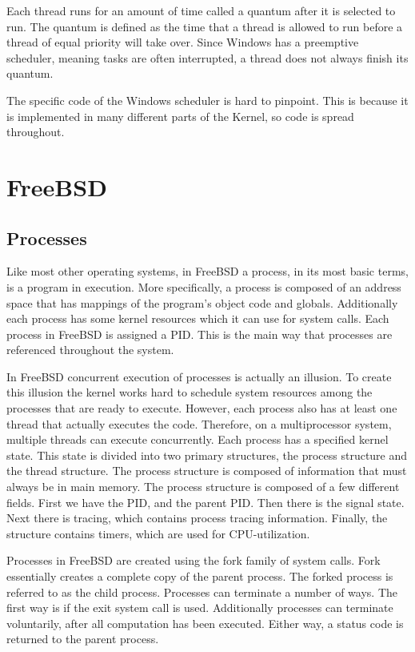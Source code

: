 \documentclass[letterpaper,10pt,titlepage,draftclsnofoot,onecolumn]{IEEEtran}
\begin{document}
Each thread runs for an amount of time called a quantum after it is selected to run. The quantum is defined as the time that a thread is allowed to run before a thread of equal priority will take over. Since Windows has a preemptive scheduler, meaning tasks are often interrupted, a thread does not always finish its quantum. 

The specific code of the Windows scheduler is hard to pinpoint. This is because it is implemented in many different parts of the Kernel, so code is spread throughout. 

\section{FreeBSD}

\subsection{Processes}
Like most other operating systems, in FreeBSD a process, in its most basic terms, is a program in execution. More specifically, a process is composed of an address space that has mappings of the program's object code and globals. Additionally each process has some kernel resources which it can use for system calls. Each process in FreeBSD is assigned a PID. This is the main way that processes are referenced throughout the system. 

In FreeBSD concurrent execution of processes is actually an illusion. \cite{freebsd} To create this illusion the kernel works hard to schedule system resources among the processes that are ready to execute. However, each process also has at least one thread that actually executes the code. Therefore, on a multiprocessor system, multiple threads can execute concurrently. Each process has a specified kernel state. This state is divided into two primary structures, the process structure and the thread structure. The process structure is composed of information that must always be in main memory. The process structure is composed of a few different fields. First we have the PID, and the parent PID. Then there is the signal state. Next there is tracing, which contains process tracing information. Finally, the structure contains timers, which are used for CPU-utilization. \cite{freebsd}

Processes in FreeBSD are created using the fork family of system calls. Fork essentially creates a complete copy of the parent process. The forked process is referred to as the child process. Processes can terminate a number of ways. The first way is if the exit system call is used. Additionally processes can terminate voluntarily, after  all computation has been executed. Either way, a status code is returned to the parent process. 
\end{document}
